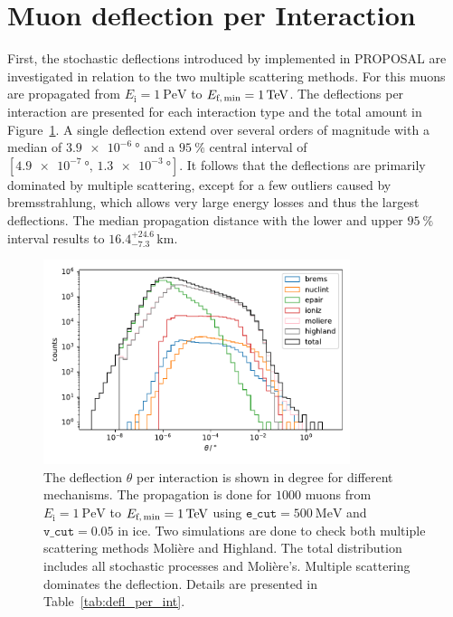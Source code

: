 \documentclass[pdflatex, sn-mathphys]{sn-jnl}%
\theoremstyle{thmstyleone}%
\theoremstyle{thmstyletwo}%
\theoremstyle{thmstylethree}%
\begin{document}
\section{Muon deflection per Interaction}\label{sec:defl_per_int}
First, the stochastic deflections introduced by \cite{Van_Ginneken} implemented 
in PROPOSAL are investigated in relation to the two multiple scattering methods. 
For this muons are propagated from $E_{\text{i}} = \SI{1}{\peta\electronvolt}$ to $E_{\text{f,\,min}} = \SI{1}{\tera\electronvolt}$.
The deflections per interaction are presented 
for each interaction type and the total amount in Figure~\ref{fig:defl_per_int}. 
A single deflection 
extend over several orders of magnitude with a median of $\SI{3.9e-6}{\degree}$
and a $\SI{95}{\percent}$ central interval of $[\SI{4.9e-7}{\degree}, \,\SI{1.3e-3}{\degree}]$. 
It follows that the deflections are primarily dominated by multiple scattering, except for a few outliers caused by bremsstrahlung, which 
allows very large energy losses and thus the largest deflections.
The median propagation distance with the lower and upper $\SI{95}{\percent}$ 
interval results to $16.4_{-7.3}^{+24.6}\,\si{\kilo\meter}$.

\begin{figure}
    \centering 
    \includegraphics[width=0.8\textwidth]{../../deflection/plots/FINAL/1PeV_1TeV_1000events_deflection_along_sampling.pdf}
    \caption{The deflection $\theta$ per interaction is shown in degree for different mechanisms. The propagation is done for $\num{1000}$ 
    muons from $E_{\text{i}} = \SI{1}{\peta\electronvolt}$ to $E_{\text{f,\,min}} = \SI{1}{\tera\electronvolt}$ using $\texttt{e\_cut} = \SI{500}{\mega\electronvolt}$ and $\texttt{v\_cut} = 0.05$ in ice. Two simulations 
    are done to check both multiple scattering methods Molière and Highland. The total distribution includes all stochastic processes and Molière's. Multiple scattering dominates the deflection. Details are presented in 
    Table~\ref{tab:defl_per_int}.}
    \label{fig:defl_per_int}
\end{figure}
\end{document}
